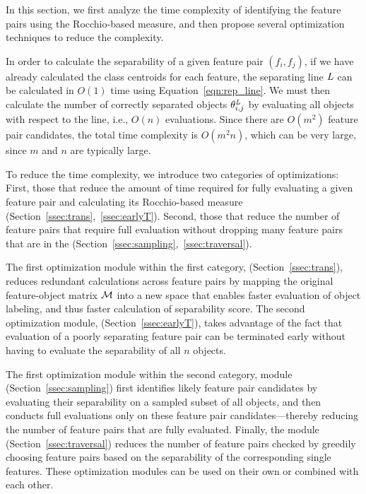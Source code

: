 In this section, we first analyze the time complexity of identifying the \topk feature pairs using the Rocchio-based measure, and then propose several optimization techniques to reduce the complexity.

 In order to calculate the separability  of a given feature pair $(f_i, f_j)$, if we have already calculated the class centroids for each feature, the separating line $\mathit{L}$ can be calculated in $O(1)$ time using Equation~\ref{eqn:rep_line}. We must then calculate the number of correctly separated objects $\theta_{i,j}^{\mathit{L}}$ by evaluating all objects with respect to the line, i.e., $O(n)$ evaluations. Since there are $O(m^2)$ feature pair candidates, the total time complexity is $O(m^2n)$, which can be  very large, 
since $m$ and $n$ are typically large. 

 To reduce the time complexity, we introduce two categories of optimizations: First, those that reduce the amount of time required for fully evaluating a given feature pair and calculating its Rocchio-based measure (Section~\ref{ssec:trans},~\ref{ssec:earlyT}). Second, those that reduce the number of feature pairs that require full evaluation without dropping many feature pairs that are in the \topk (Section~\ref{ssec:sampling},~\ref{ssec:traversal}).

The first optimization module within the first category, \trans (Section~\ref{ssec:trans}), reduces redundant calculations across feature pairs by mapping the original feature-object matrix $\mm$ into a new space that enables faster evaluation of object labeling, and thus faster calculation of separability score. The second optimization module, \earlyT (Section~\ref{ssec:earlyT}), takes advantage of the fact that evaluation of a poorly separating feature pair can be terminated early without having to evaluate the separability of all $n$ objects.

The first optimization module within the second category, \sampling module (Section~\ref{ssec:sampling}) first identifies likely \topk feature pair candidates by evaluating their separability on a sampled subset of all objects, and then conducts full evaluations only on these feature pair candidates---thereby reducing the number of feature pairs that are fully evaluated. Finally, the \traversal module (Section~\ref{ssec:traversal}) reduces the number of feature pairs checked by greedily choosing feature pairs based on the separability of the corresponding single features. These optimization modules can be used on their own or combined with each other.


